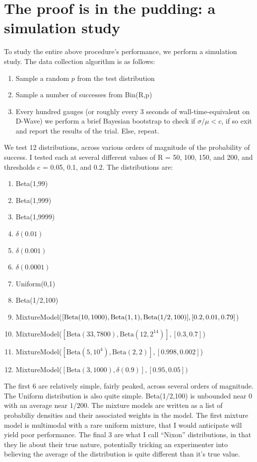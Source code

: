 \section{The proof is in the pudding: a simulation study}
To study the entire above procedure's performance, we perform a simulation study. The data collection algorithm is as follows:
\begin{enumerate}
	\item Sample a random $p$ from the test distribution
	\item Sample a number of successes from Bin(R,p)
	\item Every hundred gauges (or roughly every 3 seconds of wall-time-equivalent on D-Wave) we perform a brief Bayesian bootstrap to check if $\sigma/\mu < c$, if so exit and report the results of the trial. Else, repeat.
\end{enumerate}
We test 12 distributions, across various orders of magnitude of the probability of success. I tested each at several different values of R = 50, 100, 150, and 200, and thresholds c = 0.05, 0.1, and 0.2. The distributions are:

\begin{enumerate}
	\item Beta(1,99)
	\item Beta(1,999)
	\item Beta(1,9999)
	\item $\delta(0.01)$
	\item $\delta(0.001)$
	\item $\delta(0.0001)$
	\item Uniform(0,1)
	\item Beta(1/2,100)
	\item MixtureModel($[\mathrm{Beta}(10,1000),\mathrm{Beta}(1,1),\\
	 \mathrm{Beta}(1/2,100)],[0.2,0.01,0.79]$)
	\item MixtureModel($[\mathrm{Beta}(33,7800),\mathrm{Beta}(12,2^14)],[0.3,0.7]$)
	\item MixtureModel($[\mathrm{Beta}(5,10^4),\mathrm{Beta}(2,2)],[0.998,0.002]$)
	\item MixtureModel($[\mathrm{Beta}(3,1000),\delta(0.9)],[0.95,0.05])$
\end{enumerate}

The first 6 are relatively simple, fairly peaked, across several orders of magnitude. The Uniform distribution is also quite simple. Beta(1/2,100) is unbounded near 0 with an average near $1/200$. The mixture models are written as a list of probabiliy densities and their associated weights in the model. The first mixture model is multimodal with a rare uniform mixture, that I would anticipate will yield poor performance. The final 3 are what I call ``Nixon'' distributions, in that they lie about their true nature, potentially tricking an experimenter into believing the average of the distribution is quite different than it's true value.

